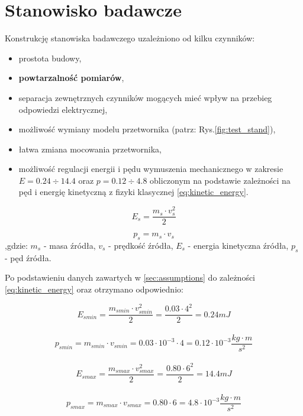 \section{Stanowisko badawcze}
\label{sec:test_stand}

Konstrukcję stanowiska badawczego uzależniono od kilku czynników:
\begin{itemize}
\item prostota budowy,
\item \textbf{powtarzalność pomiarów},
\item separacja zewnętrznych czynników mogących mieć wpływ na przebieg odpowiedzi elektrycznej,
\item możliwość wymiany modelu przetwornika (patrz: Rys.\ref{fig:test_stand}),
\item łatwa zmiana mocowania przetwornika,
\item możliwość regulacji energii i pędu wymuszenia mechanicznego w zakresie \textbf{$E = 0.24\div14.4$} oraz \textbf{$p = 0.12\div4.8$} obliczonym na podstawie zależności na pęd i energię kinetyczną z fizyki klasycznej \ref{eq:kinetic_energy}.
\end{itemize}

\begin{equation}
E_{s} = \frac{m_{s} \cdot v_{s}^2}{2}
\label{eq:kinetic_energy}
\end{equation}

\begin{equation}
p_{s} = m_{s} \cdot v_{s}
\label{eq:inertia}
\end{equation}
,gdzie: $ m_s$ - masa źródła, $v_s$ - prędkość źródła, $E_s$ - energia kinetyczna źródła, $p_s$ - pęd źródła.

Po podstawieniu danych zawartych w \ref{sec:assumptions} do zależności \ref{eq:kinetic_energy} oraz otrzymano odpowiednio:


$$E_{smin} = \frac{m_{smin} \cdot v_{smin}^2}{2}=\frac{{0.03}\cdot4^2}{2} = {0.24} mJ$$
\\$$p_{smin} = m_{smin} \cdot v_{smin} = {0.03}\cdot 10^{-3} \cdot 4 = {0.12} \cdot 10^{-3}\frac{kg \cdot m}{s^2}$$
\\$$E_{smax} = \frac{m_{smax} \cdot v_{smax}^2}{2}=\frac{0.80\cdot6^2}{2} = 14.4 mJ$$
\\$$p_{smax} = m_{smax} \cdot v_{smax} = 0.80 \cdot 6 = 4.8 \cdot 10^{-3} \frac{kg \cdot m}{s^2}$$


